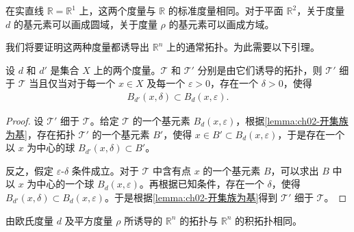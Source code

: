 \documentclass[../../main.tex]{subfiles}
\begin{document}
在实直线 $\mathbb{R} = \mathbb{R}^{1}$ 上，这两个度量与 $\mathbb{R}$ 的标准度量相同。对于平面 $\mathbb{R}^{2}$，关于度量 $d$ 的基元素可以画成圆域，关于度量 $\rho$ 的基元素可以画成方域。

我们将要证明这两种度量都诱导出 $\mathbb{R}^{n}$ 上的通常拓扑。为此需要以下引理。

\begin{lemma}[两度量间的粗细比较]\label{lemma:ch02-度量粗细比较}
设 $d$ 和 $d'$ 是集合 $X$ 上的两个度量。$\mathcal{T}$ 和 $\mathcal{T}'$ 分别是由它们诱导的拓扑，则 $\mathcal{T}'$ 细于 $\mathcal{T}$ 当且仅当对于每一个 $x \in X$ 及每一个 $\varepsilon > 0$，存在一个 $\delta > 0$，使得
\begin{align*}
B_{d'}(x, \delta) \subset B_{d}(x, \varepsilon).
\end{align*}
\end{lemma}

\begin{proof}
设 $\mathcal{T}'$ 细于 $\mathcal{T}$。给定 $\mathcal{T}$ 的一个基元素 $B_{d}(x, \varepsilon)$，根据\cref{lemma:ch02-开集族为基}，存在拓扑 $\mathcal{T}'$ 的一个基元素 $B'$，使得 $x \in B' \subset B_{d}(x, \varepsilon)$，于是存在一个以 $x$ 为中心的球 $B_{d'}(x, \delta) \subset B'$。

反之，假定 $\varepsilon$-$\delta$ 条件成立。对于 $\mathcal{T}$ 中含有点 $x$ 的一个基元素 $B$，可以求出 $B$ 中以 $x$ 为中心的一个球 $B_{d}(x, \varepsilon)$。再根据已知条件，存在一个 $\delta$，使得 $B_{d'}(x, \delta) \subset B_{d}(x, \varepsilon)$。于是根据\cref{lemma:ch02-开集族为基}得到 $\mathcal{T}'$ 细于 $\mathcal{T}$。
\end{proof}

\begin{theorem}\label{theorem:ch02-Rn度量拓扑}
由欧氏度量 $d$ 及平方度量 $\rho$ 所诱导的 $\mathbb{R}^{n}$ 的拓扑与 $\mathbb{R}^{n}$ 的积拓扑相同。
\end{theorem}
\end{document}
